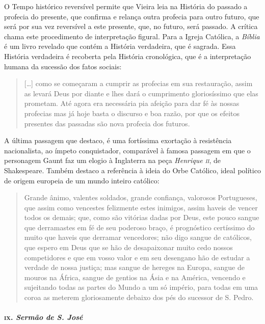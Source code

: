 O Tempo histórico reversível permite que Vieira leia na História do
passado a profecia do presente, que confirma e relança outra profecia
para outro futuro, que será por sua vez reversível a este presente, que,
no futuro, será passado. A crítica chama este procedimento de
interpretação figural. Para a Igreja Católica, a \emph{Bíblia} é um
livro revelado que contém a História verdadeira, que é sagrada. Essa
História verdadeira é recoberta pela História cronológica, que é a
interpretação humana da sucessão dos fatos sociais:

\begin{quote}
{[}\ldots{}{]} como se começaram a cumprir as profecias em sua restauração,
assim as levará Deus por diante e lhes dará o cumprimento gloriosíssimo
que elas prometam. Até agora era necessária pia afeição para dar fé às
nossas profecias mas já hoje basta o discurso e boa razão, por que os
efeitos presentes das passadas são nova profecia dos futuros.
\end{quote}

A última passagem que destaco, é uma fortíssima exortação à resistência
nacionalista, ao ímpeto conquistador, comparável à famosa passagem em
que o personagem Gaunt faz um elogio à Inglaterra na peça \emph{Henrique
\textsc{ii}}, de Shakespeare. Também destaco a referência à ideia do Orbe
Católico, ideal político de origem europeia de um mundo inteiro
católico:

\begin{quote}
Grande ânimo, valentes soldados, grande confiança, valorosos
Portugueses, que assim como vencestes felizmente estes inimigos, assim
haveis de vencer todos os demais; que, como são vitórias dadas por Deus,
este pouco sangue que derramastes em fé de seu poderoso braço, é
prognóstico certíssimo do muito que haveis que derramar vencedores; não
digo sangue de católicos, que espero em Deus que se hão de desapaixonar
muito cedo nossos competidores e que em vosso valor e em seu desengano
hão de estudar a verdade de nossa justiça; mas sangue de hereges na
Europa, sangue de mouros na África, sangue de gentios na Ásia e na
América, vencendo e sujeitando todas as partes do Mundo a um só império,
para todas em uma coroa as meterem gloriosamente debaixo dos pés do
sucessor de S. Pedro.
\end{quote}

\paragraph{\textsc{ix}. \emph{Sermão de S. José}}

